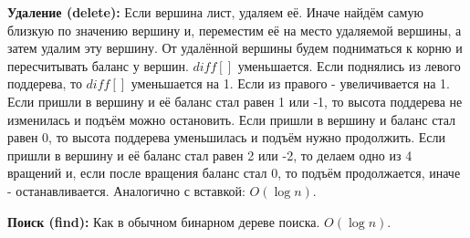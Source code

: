 \textbf{Удаление (delete):}
Если вершина лист, удаляем её.
Иначе найдём самую близкую по значению вершину и, переместим её на место удаляемой вершины, а затем удалим эту вершину.
От удалённой вершины будем подниматься к корню и пересчитывать баланс у вершин.
$diff[]$ уменьшается.
Если поднялись из левого поддерева, то $diff[]$ уменьшается на 1. Если из правого - увеличивается на 1.
Если пришли в вершину и её баланс стал равен 1 или -1, то высота поддерева не изменилась и подъём можно остановить.
Если пришли в вершину и баланс стал равен 0, то высота поддерева уменьшилась и подъём нужно продолжить.
Если пришли в вершину и её баланс стал равен 2 или -2, то делаем одно из 4 вращений и, если после вращения баланс стал 0, то подъём продолжается, иначе - останавливается.
Аналогично с вставкой: $O(\log n)$.

\textbf{Поиск (find):}
Как в обычном бинарном дереве поиска. $O(\log n)$.